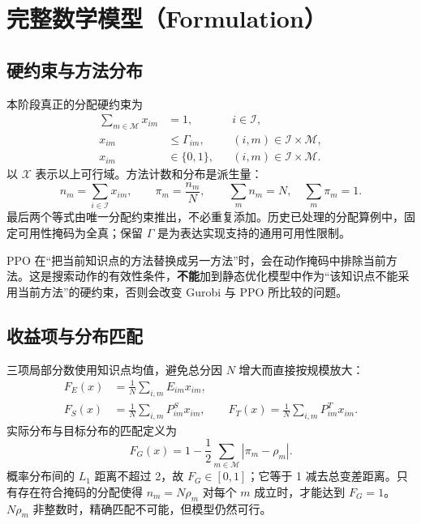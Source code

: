 \documentclass[UTF8,11pt,a4paper,fontset=fandol]{ctexart}
\newcommand{\I}{\mathcal I}
\newcommand{\M}{\mathcal M}
\newcommand{\X}{\mathcal X}
\begin{document}
\section{完整数学模型（Formulation）}
\subsection{硬约束与方法分布}
本阶段真正的分配硬约束为
\begin{align}
 \sum_{m\in\M}x_{im}&=1,&&i\in\I,\label{eq:one}\\
 x_{im}&\le\Gamma_{im},&&(i,m)\in\I\times\M,\label{eq:mask}\\
 x_{im}&\in\{0,1\},&&(i,m)\in\I\times\M.\label{eq:binary}
\end{align}
以 $\X$ 表示以上可行域。方法计数和分布是派生量：
\begin{equation}
 n_m=\sum_{i\in\I}x_{im},\qquad \pi_m=\frac{n_m}{N},\qquad
 \sum_m n_m=N,\quad\sum_m\pi_m=1.\label{eq:counts}
\end{equation}
最后两个等式由唯一分配约束推出，不必重复添加。历史已处理的分配算例中，固定可用性掩码为全真；保留 $\Gamma$ 是为表达实现支持的通用可用性限制。

PPO 在“把当前知识点的方法替换成另一方法”时，会在动作掩码中排除当前方法。这是搜索动作的有效性条件，\textbf{不能}加到静态优化模型中作为“该知识点不能采用当前方法”的硬约束，否则会改变 Gurobi 与 PPO 所比较的问题。

\subsection{收益项与分布匹配}
三项局部分数使用知识点均值，避免总分因 $N$ 增大而直接按规模放大：
\begin{align}
 F_E(x)&=\frac1N\sum_{i,m}E_{im}x_{im},\label{eq:fe}\\
 F_S(x)&=\frac1N\sum_{i,m}P^S_{im}x_{im},\qquad
 F_T(x)=\frac1N\sum_{i,m}P^T_{im}x_{im}.\label{eq:fst}
\end{align}
实际分布与目标分布的匹配定义为
\begin{equation}
 F_G(x)=1-\frac12\sum_{m\in\M}|\pi_m-\rho_m|.\label{eq:fg}
\end{equation}
概率分布间的 $L_1$ 距离不超过 2，故 $F_G\in[0,1]$；它等于 1 减去总变差距离。只有存在符合掩码的分配使得 $n_m=N\rho_m$ 对每个 $m$ 成立时，才能达到 $F_G=1$。$N\rho_m$ 非整数时，精确匹配不可能，但模型仍然可行。
\end{document}
